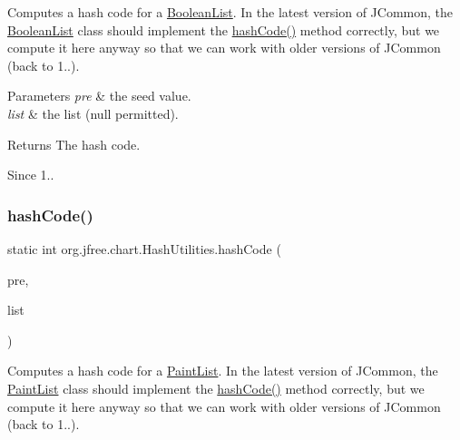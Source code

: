 Computes a hash code for a \mbox{\hyperlink{}{Boolean\+List}}. In the latest version of J\+Common, the \mbox{\hyperlink{}{Boolean\+List}} class should implement the \mbox{\hyperlink{classorg_1_1jfree_1_1chart_1_1_hash_utilities_aa24ce901adc9ad33cd04567ea5ffe5a5}{hash\+Code()}} method correctly, but we compute it here anyway so that we can work with older versions of J\+Common (back to 1..).


\begin{DoxyParams}{Parameters}
{\em pre} & the seed value. \\
\hline
{\em list} & the list ({\ttfamily null} permitted).\\
\hline
\end{DoxyParams}
\begin{DoxyReturn}{Returns}
The hash code.
\end{DoxyReturn}
\begin{DoxySince}{Since}
1.. 
\end{DoxySince}
\mbox{\label{classorg_1_1jfree_1_1chart_1_1_hash_utilities_a575aff69ef23d2879a022f44396c9ad1}} 
\subsubsection{\texorpdfstring{hash\+Code()}{hashCode()}\hspace{0.1cm}{\footnotesize\ttfamily [10/11]}}
{\footnotesize\ttfamily static int org.\+jfree.\+chart.\+Hash\+Utilities.\+hash\+Code (\begin{DoxyParamCaption}\item[{int}]{pre,  }\item[{Paint\+List}]{list }\end{DoxyParamCaption})\hspace{0.3cm}{\ttfamily [static]}}

Computes a hash code for a \mbox{\hyperlink{}{Paint\+List}}. In the latest version of J\+Common, the \mbox{\hyperlink{}{Paint\+List}} class should implement the \mbox{\hyperlink{classorg_1_1jfree_1_1chart_1_1_hash_utilities_aa24ce901adc9ad33cd04567ea5ffe5a5}{hash\+Code()}} method correctly, but we compute it here anyway so that we can work with older versions of J\+Common (back to 1..).



